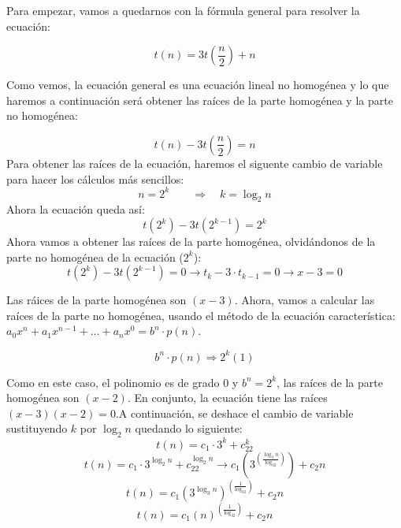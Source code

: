 \documentclass[10pt,a4paper,spanish]{report}
\theoremstyle{definition}
\theoremstyle{remark}
\begin{document}
\begin{center}
  Para empezar, vamos a quedarnos con la fórmula general para resolver la ecuación:

  \begin{displaymath}
    t(n) = 3t\left(\frac{n}{2}\right) + n
  \end{displaymath}

  Como vemos, la ecuación general es una ecuación lineal no homogénea y lo que haremos a continuación será obtener las raíces de la parte homogénea y la parte no homogénea:

  \begin{displaymath}
    t(n) - 3t\left(\frac{n}{2}\right) = n
  \end{displaymath}
  Para obtener las raíces de la ecuación, haremos el siguente cambio de variable para hacer los cálculos más sencillos:
  \begin{displaymath}
    n = 2^k \qquad \Longrightarrow \quad k = \log_2 n
  \end{displaymath}
  Ahora la ecuación queda así:
  \begin{displaymath}
    t(2^k) - 3t(2^{k-1}) = 2^k
  \end{displaymath}
  Ahora vamos a obtener las raíces de la parte homogénea, olvidándonos de la parte no homogénea de la ecuación ($2^k$):
  \begin{displaymath}
    t(2^k) -3t(2^{k-1}) = 0 \longrightarrow t_k - 3\cdot t_{k-1} = 0 \longrightarrow x - 3 = 0
  \end{displaymath}

  Las ráices de la parte homogénea son $(x-3)$. Ahora, vamos a calcular las raíces de la parte no homogénea, usando el método de la ecuación característica: $a_0x^n + a_1x^{n-1}+\ldots+a_nx^0 = b^n\cdot p(n)$.

  \begin{displaymath}
      b^n\cdot p(n) \Rightarrow 2^k(1)
  \end{displaymath}

  Como en este caso, el polinomio es de grado 0 y $b^n = 2^k$, las raíces de la parte homogénea son $(x-2)$. En conjunto, la ecuación tiene las raíces $(x-3)(x-2) = 0$.A continuación, se deshace el cambio de variable sustituyendo $k$ por $\log_2 n$ quedando lo siguiente:
  \begin{displaymath}
    t(n) = c_1\cdot 3^k + c_22^k
  \end{displaymath}
  \begin{displaymath}
    t(n) = c_1\cdot 3^{\log_2n} + c_22^{\log_2n} \longrightarrow c_1\left(3^{\left(\frac{\log_3n}{\log_32}\right)}\right) + c_2n
  \end{displaymath}
  \begin{displaymath}
    t(n) = c_1\left(3^{\log_3n}\right)^{\left(\frac{1}{\log_32}\right)} + c_2n
  \end{displaymath}
  \begin{displaymath}
    t(n) = c_1\left(n\right)^{\left(\frac{1}{\log_32}\right)} + c_2n
  \end{displaymath}
\end{center}
\end{document}
